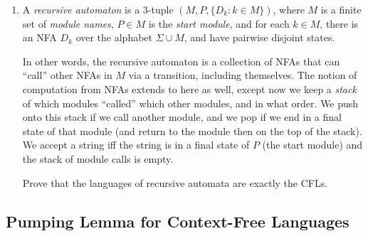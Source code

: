 \begin{enumerate}[resume]
\item {} A \emph{recursive automaton} is a 3-tuple $(M, P, \{D_k : k \in M \})$, where $M$ is a finite set of \emph{module names}, $P \in M$ is the \emph{start module}, and for each $k \in M$, there is an NFA $D_k$ over the alphabet $\Sigma \cup M$, and have pairwise disjoint states. 

In other words, the recursive automaton is a collection of NFAs that can ``call'' other NFAs in $M$ via a transition, including themselves. 
The notion of computation from NFAs extends to here as well, except now we keep a \emph{stack} of which modules ``called'' which other modules, and in what order. 
We push onto this stack if we call another module, and we pop if we end in a final state of that module (and return to the module then on the top of the stack).
We accept a string iff the string is in a final state of $P$ (the start module) and the stack of module calls is empty.
		
Prove that the languages of recursive automata are exactly the CFLs.
\end{enumerate}

\subsection{Pumping Lemma for Context-Free Languages}

